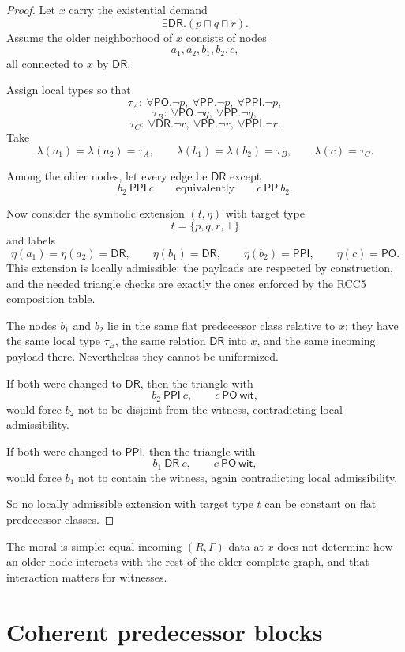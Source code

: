 \documentclass[11pt]{article}
\theoremstyle{definition}
\newcommand{\DR}{\mathsf{DR}}
\newcommand{\PO}{\mathsf{PO}}
\newcommand{\PP}{\mathsf{PP}}
\newcommand{\PPI}{\mathsf{PPI}}
\newcommand{\wit}{\mathsf{wit}}
\begin{document}
\begin{proof}
Let $x$ carry the existential demand
\[
\exists \DR.(p\sqcap q\sqcap r).
\]
Assume the older neighborhood of $x$ consists of nodes
\[
a_1,a_2,b_1,b_2,c,
\]
all connected to $x$ by $\DR$.

Assign local types so that
\[
\tau_A:\ \forall \PO.\neg p,\ \forall \PP.\neg p,\ \forall \PPI.\neg p,
\]
\[
\tau_B:\ \forall \PO.\neg q,\ \forall \PP.\neg q,
\]
\[
\tau_C:\ \forall \DR.\neg r,\ \forall \PP.\neg r,\ \forall \PPI.\neg r.
\]
Take
\[
\lambda(a_1)=\lambda(a_2)=\tau_A,\qquad
\lambda(b_1)=\lambda(b_2)=\tau_B,\qquad
\lambda(c)=\tau_C.
\]

Among the older nodes, let every edge be $\DR$ except
\[
b_2\ \PPI\ c
\qquad\text{equivalently}\qquad
c\ \PP\ b_2.
\]

Now consider the symbolic extension $(t,\eta)$ with target type
\[
t=\{p,q,r,\top\}
\]
and labels
\[
\eta(a_1)=\eta(a_2)=\DR,
\qquad
\eta(b_1)=\DR,
\qquad
\eta(b_2)=\PPI,
\qquad
\eta(c)=\PO.
\]
This extension is locally admissible: the payloads are respected by construction, and the needed triangle checks are exactly the ones enforced by the RCC5 composition table.

The nodes $b_1$ and $b_2$ lie in the same flat predecessor class relative to $x$: they have the same local type $\tau_B$, the same relation $\DR$ into $x$, and the same incoming payload there. Nevertheless they cannot be uniformized.

If both were changed to $\DR$, then the triangle with
\[
b_2\ \PPI\ c,
\qquad
c\ \PO\ \wit,
\]
would force $b_2$ not to be disjoint from the witness, contradicting local admissibility.

If both were changed to $\PPI$, then the triangle with
\[
b_1\ \DR\ c,
\qquad
c\ \PO\ \wit,
\]
would force $b_1$ not to contain the witness, again contradicting local admissibility.

So no locally admissible extension with target type $t$ can be constant on flat predecessor classes.\qedhere
\end{proof}

The moral is simple: equal incoming $(R,\Gamma)$-data at $x$ does not determine how an older node interacts with the rest of the older complete graph, and that interaction matters for witnesses.

\section{Coherent predecessor blocks}
\end{document}
